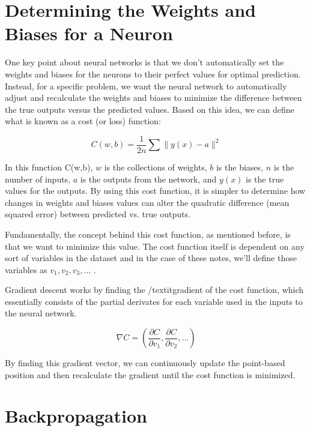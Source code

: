 \documentclass[11pt]{article}
\theoremstyle{definition}
\begin{document}
\section{Determining the Weights and Biases for a Neuron}
One key point about neural networks is that we don't automatically set the weights and biases for the neurons to their perfect values for optimal prediction. Instead, for a specific problem, we want the neural network to automatically adjust and recalculate the weights and biases to minimize the difference between the true outputs versus the predicted values. Based on this idea, we can define what is known as a cost (or loss) function:

$$
C(w,b) = \frac{1}{2n}\sum\parallel y(x)-a\parallel^{2}
$$

In this function C(w,b),  \(w\) is the collections of weights, \(b\) is the biases, \(n\) is the number of inputs, \(a\) is the outputs from the network, and \(y(x)\) is the true values for the outputs. By using this cost function, it is simpler to determine how changes in weights and biases values can alter the quadratic difference (mean squared error) between predicted vs. true outputs.

Fundamentally, the concept behind this cost function, as mentioned before, is that we want to minimize this value. The cost function itself is dependent on any sort of variables in the dataset and in the case of these notes, we'll define those variables as \(v_1, v_2, v_3, ...\) .

Gradient descent works by finding the /textit{gradient} of the cost function, which essentially consists of the partial derivates for each variable used in the inputs to the neural network.

$$
\nabla C = \left (\frac{\partial C}{\partial v_1} , \frac{\partial C}{\partial v_2}, ... \right )
$$

By finding this gradient vector, we can continuously update the point-based position and then recalculate the gradient until the cost function is minimized.

\section{Backpropagation}
\end{document}
